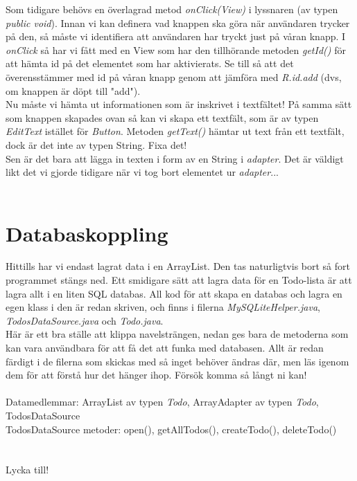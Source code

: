 \documentclass[11 pt, titlepage]{article} %
\begin{document}
Som tidigare behövs en överlagrad metod \textit{onClick(View)} i lyssnaren (av typen \textit{public void}). Innan vi kan definera vad knappen ska göra när användaren trycker på den, så måste vi identifiera att användaren har tryckt just på våran knapp.
I \textit{onClick} så har vi fått med en View som har den tillhörande metoden \textit{getId()} för att hämta id på det elementet som har aktivierats. Se till så att det överensstämmer med id på våran knapp genom att jämföra med \textit{R.id.add} (dvs, om knappen är döpt till "add").\\

Nu måste vi hämta ut informationen som är inskrivet i textfältet! På samma sätt som knappen skapades ovan så kan vi skapa ett textfält, som är av typen \textit{EditText} istället för \textit{Button}.
Metoden \textit{getText()} hämtar ut text från ett textfält, dock är det inte av typen String. Fixa det!\\

Sen är det bara att lägga in texten i form av en String i \textit{adapter}. Det är väldigt likt det vi gjorde tidigare när vi tog bort elementet ur \textit{adapter}...\\ \\
\section{Databaskoppling}
Hittills har vi endast lagrat data i en ArrayList. Den tas naturligtvis bort så fort programmet stängs ned. Ett smidigare sätt att lagra data för en Todo-lista är att lagra allt i en liten SQL databas. All kod för att skapa en databas och lagra en egen klass i den är redan skriven, och finns i filerna \textit{MySQLiteHelper.java}, \textit{TodosDataSource.java} och \textit{Todo.java}.\\

Här är ett bra ställe att klippa navelsträngen, nedan ges bara de metoderna som kan vara användbara för att få det att funka med databasen. Allt är redan färdigt i de filerna som skickas med så inget behöver ändras där, men läs igenom dem för att förstå hur det hänger ihop. Försök komma så långt ni kan!\\ \\

Datamedlemmar: ArrayList av typen \textit{Todo}, ArrayAdapter av typen \textit{Todo}, TodosDataSource \\
TodosDataSource metoder: open(), getAllTodos(), createTodo(), deleteTodo() \\

\\ \\

Lycka till!
\end{document}
